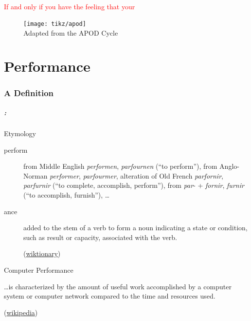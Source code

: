 \documentclass[9pt,xcolor=table]{beamer}
\begin{document}
\begin{frame}
\frametitle{\insertsection{}}
\begin{center}
  \huge\textcolor{red}{If and only if you have the feeling that your }
\end{center}
\begin{figure}[htb]
\texttt{[image: tikz/apod]}\\[6pt]
Adapted from the APOD Cycle \cite{CUDABestPractises}
\end{figure}
\end{frame}

\part{Performance}
\section{A Definition}
\begin{frame}
\frametitle{\insertsectionhead{} : \insertpart{}
}
\vfill
\begin{block}{Etymology}
  \begin{description}
  \item[perform] from Middle English \textit{performen}, \textit{parfournen} (``to perform''), from Anglo-Norman \textit{performer}, \textit{parfourmer}, alteration of Old French \textit{parfornir}, \textit{parfurnir} (``to complete, accomplish, perform''), from \textit{par}- + \textit{fornir}, \textit{furnir} (``to accomplish, furnish''), \dots
  \item[ance] added to the stem of a verb to form a noun indicating a state or condition, such as result or capacity, associated with the verb.\\
    \begin{flushright}
      \small(\href{http://en.wiktionary.org/wiki/perform}{wiktionary})
    \end{flushright}
  \end{description}
\end{block}
\vfill
\begin{block}{Computer Performance}
  \begin{center}
    \dots is characterized by the amount of \alert<2->{useful work} accomplished by a computer system or computer network compared to the \alert<3->{time} and \alert<4->{resources} used.\\
  \end{center}
  \begin{flushright}
    \small(\href{http://en.wikipedia.org/wiki/Computer_performance}{wikipedia})
  \end{flushright}

  \end{block}
\vfill
\end{frame}
\end{document}
